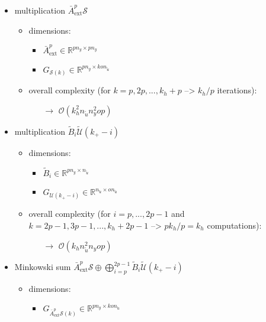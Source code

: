 \documentclass{article}
\begin{document}
\begin{itemize}
    \item multiplication $\bar{A}_\text{ext}^{p} {\mathcal{S}}$
    \begin{itemize}
        \item dimensions:
        \begin{itemize}
            \item $\bar{A}_\text{ext}^p \in \mathbb{R}^{pn_y \times pn_y}$
            \item $G_{\mathcal{S}(k)} \in \mathbb{R}^{pn_y \times k o n_{\tilde{u}}}$
        \end{itemize}
        \item overall complexity (for $k=p, 2p, ..., k_h+p$ --> $k_h/p$ iterations):
        \begin{itemize}
            \item[$\rightarrow$] $\mathcal{O}(k_h^2 n_{\tilde{u}} n_y^2 o p)$
        \end{itemize}
    \end{itemize}    
    \item multiplication $\tilde{B}_{i} \tilde{\mathcal{U}}(k_+-i)$
    \begin{itemize}
        \item dimensions:
        \begin{itemize}
            \item $\tilde{B}_{i} \in \mathbb{R}^{pn_y \times n_{\tilde{u}}}$
            \item $G_{\mathcal{U}(k_+-i)} \in \mathbb{R}^{n_{\tilde{u}} \times o n_{\tilde{u}}}$
        \end{itemize}
        \item overall complexity (for $i=p,...,2p-1$ and $k=2p-1, 3p-1, ..., k_h+2p-1$ --> $pk_h/p=k_h$ computations):
        \begin{itemize}
            \item[$\rightarrow$] $\mathcal{O}(k_h n_{\tilde{u}}^2 n_y o p)$
        \end{itemize}
    \end{itemize}
    \item Minkowski sum $\bar{A}_\text{ext}^{p} {\mathcal{S}}  \oplus \bigoplus_{i=p}^{2p-1} \tilde{B}_{i} \tilde{\mathcal{U}}(k_+-i)$
    \begin{itemize}
        \item dimensions:
        \begin{itemize}            
            \item $G_{\bar{A}_\text{ext}^{p} {\mathcal{S}}(k)} \in \mathbb{R}^{pn_y \times k o n_{\tilde{u}}}$

\end{itemize}
\end{itemize}
\end{itemize}
\end{document}
